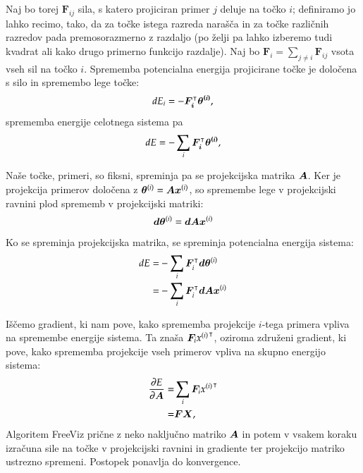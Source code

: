 Naj bo torej ${\bm F_{ij}}$ sila, s katero projiciran primer $j$ deluje na točko $i$; definiramo jo lahko recimo, tako, da za točke istega razreda narašča in za točke različnih razredov pada premosorazmerno z razdaljo (po želji pa lahko izberemo tudi kvadrat ali kako drugo primerno funkcijo razdalje). Naj bo ${\bm F_i} = \sum_{j\ne i} {\bm F_{ij}}$ vsota vseh sil na točko $i$. Sprememba potencialna energija projicirane točke je določena s silo in spremembo lege točke:
\begin{equation}
  \nonumber
  dE_i=-\boldsymbol{\bm F_i}^\intercal \boldsymbol{\theta^{(i)}},
\end{equation}
%
sprememba energije celotnega sistema pa
\begin{equation}
  \nonumber
  dE=-\sum_i\boldsymbol{\bm F_i}^\intercal\boldsymbol{\theta^{(i)}},
\end{equation}

Naše točke, primeri, so fiksni, spreminja pa se projekcijska matrika $\boldsymbol{A}$. Ker je projekcija primerov določena z $\boldsymbol{\theta}^{(i)}=\boldsymbol{A}\boldsymbol{x}^{(i)}$, so spremembe lege v projekcijski ravnini plod sprememb v projekcijski matriki:
\begin{equation}
  \nonumber
  \boldsymbol{d\theta}^{(i)}=\boldsymbol{dA}\boldsymbol{x}^{(i)}
\end{equation}
%
Ko se spreminja projekcijska matrika, se spreminja potencialna energija sistema:
\begin{equation}
  \begin{split}
    \nonumber
    dE = & -\sum_i \boldsymbol{F}_i^\intercal \boldsymbol{d\theta}^{(i)} \\
    \nonumber
    = & -\sum_i \boldsymbol{F}_i^\intercal \boldsymbol{dA}\boldsymbol{x}^{(i)}
  \end{split}
\end{equation}
%

Iščemo gradient, ki nam pove, kako sprememba projekcije $i$-tega primera vpliva na spremembe energije sistema. Ta znaša $\boldsymbol{F}_i{{x}^{(i)}}^\intercal$, 
oziroma združeni gradient, ki pove, kako sprememba projekcije vseh primerov vpliva na skupno energijo sistema:
\begin{equation}
  \begin{split}
    \frac{\partial E}{\partial \boldsymbol{A}} = & \sum_i\boldsymbol{F}_i{{x}^{(i)}}^\intercal \\
 = & {\bm F} {\bm X},
  \end{split}
\end{equation}
%
Algoritem FreeViz prične z neko naključno matriko $\boldsymbol{A}$ in potem v vsakem koraku izračuna sile na točke v projekcijski ravnini in gradiente ter projekcijo matriko ustrezno spremeni. Postopek ponavlja do konvergence.

